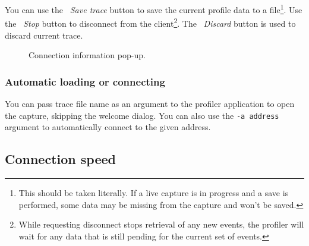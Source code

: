 \documentclass[hidelinks,titlepage,a4paper]{article}
\begin{document}
You can use the \faSave{}~\emph{Save trace} button to save the current profile data to a file\footnote{This should be taken literally. If a live capture is in progress and a save is performed, some data may be missing from the capture and won't be saved.}. Use the \faPlug{}~\emph{Stop} button to disconnect from the client\footnote{While requesting disconnect stops retrieval of any new events, the profiler will wait for any data that is still pending for the current set of events.}. The \faExclamationTriangle{}~\emph{Discard} button is used to discard current trace.

\begin{figure}[h]
\centering{}
\caption{Connection information pop-up.}
\label{connectioninfo}
\end{figure}

\subsubsection{Automatic loading or connecting}

You can pass trace file name as an argument to the profiler application to open the capture, skipping the welcome dialog. You can also use the \texttt{-a address} argument to automatically connect to the given address.

\subsection{Connection speed}
\end{document}
